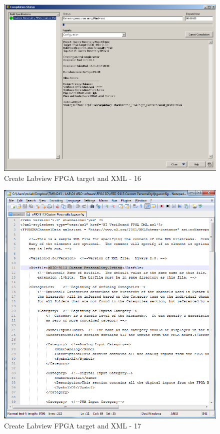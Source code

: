 \documentclass[a4paper,english]{report}
\begin{document}
\begin{figure}[htb!]
	\centering \includegraphics[scale=0.45]{Screenshots/Screenshot_2015-01-16_20-01-32.png}
	\caption{Create Labview FPGA target and XML - 16}
	\label{fig: Create Labview FPGA target and XML-16} 
\end{figure}
\begin{figure}[htb!]
	\centering \includegraphics[scale=0.45]{Screenshots/Screenshot_2015-01-17_13-59-31.png}
	\caption{Create Labview FPGA target and XML - 17}
	\label{fig: Create Labview FPGA target and XML-17} 
\end{figure}
\end{document}
